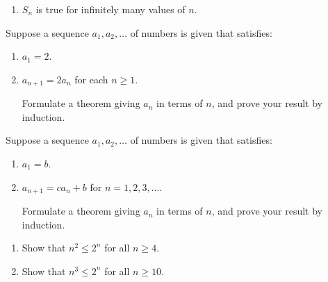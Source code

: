 \begin{multicols}{2}
\begin{ex}
\begin{enumerate}
\item $S_{n}$ is true for infinitely many values of $n$.

\end{enumerate}
\end{ex}

\begin{ex}
Suppose a sequence $a_{1}, a_{2}, \dots$  of numbers is given that satisfies:


\begin{enumerate}
\item $a_{1} = 2$.

\item $a_{n+1} = 2a_{n}$ for each $n \geq 1$.


Formulate a theorem giving $a_{n}$ in terms of $n$, and prove your result by induction.

\end{enumerate}
\end{ex}

\begin{ex}
Suppose a sequence $a_{1}, a_{2}, \dots$  of numbers is given that satisfies:


\begin{enumerate}
\item $a_{1} = b$.

\item $a_{n+1} = ca_{n} + b$ for $n = 1, 2, 3, \dots$.


Formulate a theorem giving $a_{n}$ in terms of $n$, and prove your result by induction.

\end{enumerate}
\end{ex}

\begin{ex}
\begin{enumerate}[label={\alph*.}]
\item Show that $n^{2} \leq 2^{n}$ for all $n \geq 4$.

\item Show that $n^{3} \leq 2^{n}$ for all $n \geq 10$.

\end{enumerate}
\end{ex}

\end{multicols}
